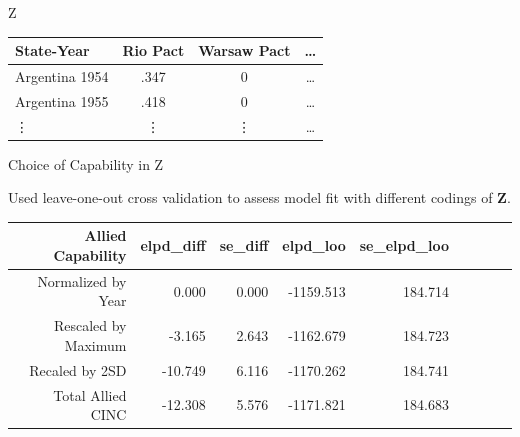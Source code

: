 \documentclass[12pt]{beamer}
\begin{document}


\begin{frame}[standout]{Z} 

\begin{tabular}{lccc}
State-Year & Rio Pact & Warsaw Pact & \ldots \\
\hline
Argentina 1954 & .347 & 0 & \ldots \\
Argentina 1955 & .418  & 0 & \ldots  \\
 \vdots & \vdots & \vdots & \ldots  
\end{tabular}

 \end{frame}
 
 


\begin{frame}{Choice of Capability in Z} 

Used leave-one-out cross validation to assess model fit with different codings of \textbf{Z}. 

\begin{center}
\begin{tabular}{rrrrrrrrr}
  \hline
 Allied Capability & elpd\_diff & se\_diff & elpd\_loo & se\_elpd\_loo  \\ 
  \hline
  Normalized by Year & 0.000 & 0.000 & -1159.513 & 184.714 \\ 
  Rescaled by Maximum & -3.165 & 2.643 & -1162.679 & 184.723  \\ 
  Recaled by 2SD & -10.749 & 6.116 & -1170.262 & 184.741  \\ 
  Total Allied CINC & -12.308 & 5.576 & -1171.821 & 184.683  \\ 
   \hline
\end{tabular}
\end{center} 

 \end{frame}




\end{document}
